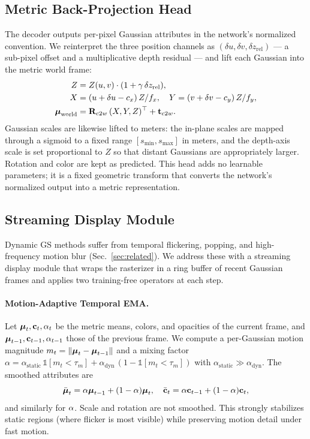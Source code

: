 \subsection{Metric Back-Projection Head}
\label{sec:method-head}

The decoder outputs per-pixel Gaussian attributes in the network's
normalized convention. We reinterpret the three position channels as
$(\delta u, \delta v, \delta z_\text{rel})$ --- a sub-pixel offset and a
multiplicative depth residual --- and lift each Gaussian into the metric
world frame:
\begin{align}
\label{eq:backproj}
Z &= Z(u,v) \cdot (1 + \gamma\, \delta z_\text{rel}), \\
X &= (u + \delta u - c_x)\, Z / f_x, \quad
Y = (v + \delta v - c_y)\, Z / f_y, \\
\boldsymbol{\mu}_\text{world} &= \mathbf{R}_{c2w}\, (X, Y, Z)^\top + \mathbf{t}_{c2w}.
\end{align}
Gaussian scales are likewise lifted to meters: the in-plane scales are
mapped through a sigmoid to a fixed range $[s_\text{min}, s_\text{max}]$
in meters, and the depth-axis scale is set proportional to $Z$ so that
distant Gaussians are appropriately larger. Rotation and color are kept
as predicted. This head adds no learnable parameters; it is a fixed
geometric transform that converts the network's normalized output into a
metric representation.

\subsection{Streaming Display Module}
\label{sec:method-display}

Dynamic GS methods suffer from temporal flickering, popping, and
high-frequency motion blur (Sec.~\ref{sec:related}). We address these
with a streaming display module that wraps the rasterizer in a ring
buffer of recent Gaussian frames and applies two training-free operators
at each step.

\paragraph{Motion-Adaptive Temporal EMA.}
Let $\boldsymbol{\mu}_t, \mathbf{c}_t, \alpha_t$ be the metric means, colors, and opacities
of the current frame, and $\boldsymbol{\mu}_{t-1}, \mathbf{c}_{t-1}, \alpha_{t-1}$ those of
the previous frame. We compute a per-Gaussian motion magnitude
$m_t = \|\boldsymbol{\mu}_t - \boldsymbol{\mu}_{t-1}\|$ and a mixing factor
$\alpha = \alpha_\text{static}\, \mathbb{1}[m_t < \tau_m] +
\alpha_\text{dyn}\, (1 - \mathbb{1}[m_t < \tau_m])$ with
$\alpha_\text{static} \gg \alpha_\text{dyn}$. The smoothed attributes are
\begin{equation}
\bar{\boldsymbol{\mu}}_t = \alpha \boldsymbol{\mu}_{t-1} + (1-\alpha) \boldsymbol{\mu}_t, \quad
\bar{\mathbf{c}}_t = \alpha \mathbf{c}_{t-1} + (1-\alpha) \mathbf{c}_t,
\end{equation}
and similarly for $\alpha$. Scale and rotation are not smoothed. This
strongly stabilizes static regions (where flicker is most visible) while
preserving motion detail under fast motion.

